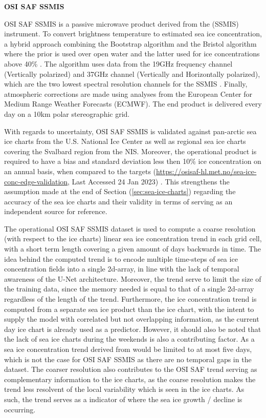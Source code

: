 \documentclass[../main/thesis.tex]{subfiles}
\begin{document}
\textbf{OSI SAF SSMIS}

OSI SAF SSMIS is a passive microwave product derived from the (SSMIS) instrument. To convert brightness temperature to estimated sea ice concentration, a hybrid approach combining the Bootstrap algorithm \citep{Comiso1997} and the Bristol algorithm \citep{Smith1996} where the prior is used over open water and the latter used for ice concentrations above 40\% \citep{Tonboe2017}. The algorithm uses data from the 19GHz frequency channel (Vertically polarized) and 37GHz channel (Vertically and Horizontally polarized), which are the two lowest spectral resolution channels for the SSMIS \cite{Tonboe2017}. Finally, atmospheric corrections are made using analyses from the European Center for Medium Range Weather Forecasts (ECMWF). The end product is delivered every day on a 10km polar stereographic grid.

With regards to uncertainty, OSI SAF SSMIS is validated against pan-arctic sea ice charts from the U.S. National Ice Center as well as regional sea ice charts covering the Svalbard region from the NIS. Moreover, the operational product is required to have a bias and standard deviation less then 10\% ice concentration on an annual basis, when compared to the targets (\url{https://osisaf-hl.met.no/sea-ice-conc-edge-validation}, Last Accessed 24 Jan 2023) \citep{Lavelle2017}. This strengthens the assumption made at the end of Section (\ref{sec:sea-ice-charts}) regarding the accuracy of the sea ice charts and their validity in terms of serving as an independent source for reference.

The operational OSI SAF SSMIS dataset is used to compute a coarse resolution (with respect to the ice charts) linear sea ice concentration trend in each grid cell, with a short term length covering a given amount of days backwards in time. The idea behind the computed trend is to encode multiple time-steps of sea ice concentration fields into a single 2d-array, in line with the lack of temporal awareness of the U-Net architecture. Moreover, the trend serve to limit the size of the training data, since the memory needed is equal to that of a single 2d-array regardless of the length of the trend. Furthermore, the ice concentration trend is computed from a separate sea ice product than the ice chart, with the intent to supply the model with correlated but not overlapping information, as the current day ice chart is already used as a predictor. However, it should also be noted that the lack of sea ice charts during the weekends \citep{Dinessen2020} is also a contributing factor. As a sea ice concentration trend derived from \citet{Dinessen2020} would be limited to at most five days, which is not the case for OSI SAF SSMIS as there are no temporal gaps in the dataset. The coarser resolution also contributes to the OSI SAF trend serving as complementary information to the ice charts, as the coarse resolution makes the trend less resolvent of the local variability which is seen in the ice charts. As such, the trend serves as a indicator of where the sea ice growth / decline is occurring.
\end{document}
